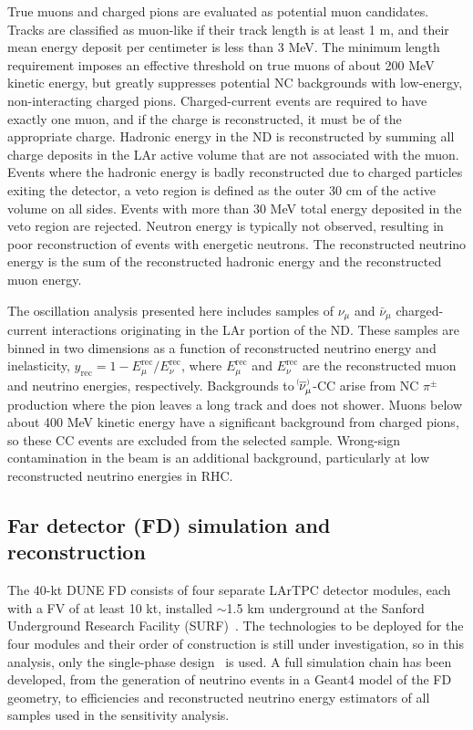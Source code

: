 True muons and charged pions are evaluated as potential muon candidates. Tracks are classified as muon-like if their track length is at least 1 m, and their mean energy deposit per centimeter is less than 3 MeV. The minimum length requirement imposes an effective threshold on true muons of about 200 MeV kinetic energy, but greatly suppresses potential NC backgrounds with low-energy, non-interacting charged pions. Charged-current events are required to have exactly one muon, and if the charge is reconstructed, it must be of the appropriate charge. Hadronic energy in the ND is reconstructed by summing all charge deposits in the LAr active volume that are not associated with the muon. Events where the hadronic energy is badly reconstructed due to charged particles exiting the detector, a veto region is defined as the outer 30 cm of the active volume on all sides. Events with more than 30 MeV total energy deposited in the veto region are rejected. Neutron energy is typically not observed, resulting in poor reconstruction of events with energetic neutrons. The reconstructed neutrino energy is the sum of the reconstructed hadronic energy and the reconstructed muon energy.

The oscillation analysis presented here includes samples of $\nu_{\mu}$ and $\bar{\nu}_{\mu}$ charged-current interactions originating in the LAr portion of the ND. These samples are binned in two dimensions as a function of reconstructed neutrino energy and inelasticity, $y_{\mathrm{rec}} = 1 - E^{\mathrm{rec}}_{\mu}/E^{\mathrm{rec}}_{\nu}$, where $E^{\mathrm{rec}}_{\mu}$ and $E^{\mathrm{rec}}_{\nu}$ are the reconstructed muon and neutrino energies, respectively. Backgrounds to $\nu^{\bracketbar}_{\mu}$-CC arise from NC $\pi^{\pm}$ production where the pion leaves a long track and does not shower. Muons below about 400 MeV kinetic energy have a significant background from charged pions, so these CC events are excluded from the selected sample. Wrong-sign contamination in the beam is an additional background, particularly at low reconstructed neutrino energies in RHC.

\subsection{Far detector (FD) simulation and reconstruction}
The 40-kt DUNE FD consists of four separate LArTPC detector modules, each with a FV of at least 10 kt, installed $\sim$1.5 km underground at the Sanford Underground Research Facility (SURF)~\cite{Abi:2018dnh}. The technologies to be deployed for the four modules and their order of construction is still under investigation, so in this analysis, only the single-phase design~\cite{Abi:2020loh} is used. A full simulation chain has been developed, from the generation of neutrino events in a Geant4 model of the FD geometry, to efficiencies and reconstructed neutrino energy estimators of all samples used in the sensitivity analysis.

